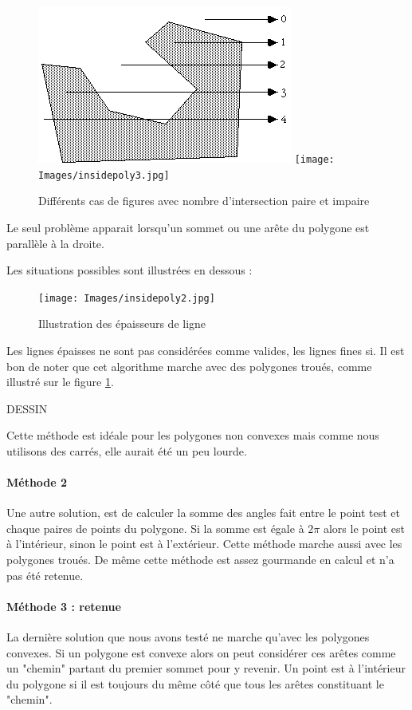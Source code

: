 \documentclass[a4paper,12pt]{report}
\begin{document}
\begin{figure}[h]
\centering
\includegraphics[scale=0.6]{Images/insidepoly1.jpg}
\texttt{[image: Images/insidepoly3.jpg]}
\caption{Différents cas de figures avec nombre d'intersection paire et impaire}
\label{nbintersect}
\end{figure}
\vspace{0.5cm}

Le seul problème apparait lorsqu'un sommet ou une arête du polygone est parallèle à la droite.

Les situations possibles sont illustrées en dessous :

\begin{figure}[h]
\centering
\texttt{[image: Images/insidepoly2.jpg]}
\caption{Illustration des épaisseurs de ligne}
\end{figure}
\vspace{0.5cm}

Les lignes épaisses ne sont pas considérées comme valides, les lignes fines si.
Il est bon de noter que cet algorithme marche avec des polygones troués, comme illustré sur le figure \ref{nbintersect}.

DESSIN

Cette méthode est idéale pour les polygones non convexes mais comme nous utilisons des carrés, elle aurait été un peu lourde.

\paragraph{Méthode 2 }
Une autre solution, est de calculer la somme des angles fait entre le point test et chaque paires de points du polygone. Si la somme est égale à $2\pi$ alors le point est à l'intérieur, sinon le point est à l'extérieur. 
Cette méthode marche aussi avec les polygones troués.
De même cette méthode est assez gourmande en calcul et n'a pas été retenue.

\paragraph{Méthode 3 : retenue}
La dernière solution que nous avons testé ne marche qu'avec les polygones convexes. Si un polygone est convexe alors on peut considérer ces arêtes comme un "chemin" partant du premier sommet pour y revenir. 
Un point est à l'intérieur du polygone si il est toujours du même côté que tous les arêtes constituant le "chemin".
\end{document}

